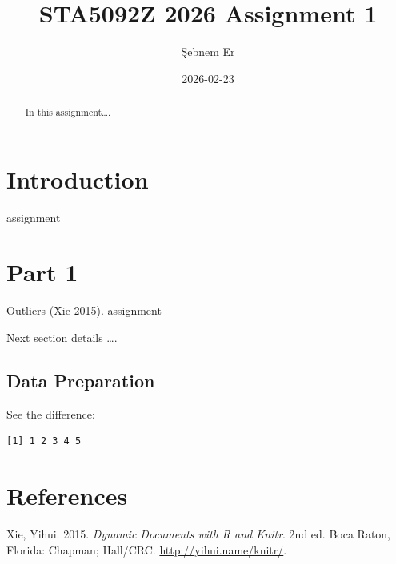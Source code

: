 \documentclass[
  letterpaper,
  DIV=11,
  numbers=noendperiod]{scrartcl}
\title{STA5092Z 2026 Assignment 1}
\author{Şebnem Er}
\date{2026-02-23}
\newlength{\cslhangindent}
\newenvironment{CSLReferences}[2] %
 {\begin{list}{}{%
  \setlength{\itemindent}{0pt}
  \setlength{\leftmargin}{0pt}
  \setlength{\parsep}{0pt}
  \ifodd #1
   \setlength{\leftmargin}{\cslhangindent}
   \setlength{\itemindent}{-1\cslhangindent}
  \fi
  \setlength{\itemsep}{#2\baselineskip}}}
 {\end{list}}
\renewcommand*\contentsname{Table of contents}
\newcommand\contentsname{Table of contents}
\begin{document}
\maketitle
\begin{abstract}
In this assignment\ldots.
\end{abstract}

\renewcommand*\contentsname{Table of contents}
{
\hypersetup{linkcolor=}
\setcounter{tocdepth}{3}
\tableofcontents
}

\section{Introduction}\label{introduction}

assignment

\section{Part 1}\label{part-1}

Outliers (Xie 2015). assignment

Next section details \ldots.

\subsection{Data Preparation}\label{data-preparation}

See the difference:

\begin{verbatim}
[1] 1 2 3 4 5
\end{verbatim}

\section*{References}\label{references}

\label{refs}
\begin{CSLReferences}{1}{0}
Xie, Yihui. 2015. \emph{Dynamic Documents with {R} and Knitr}. 2nd ed.
Boca Raton, Florida: Chapman; Hall/CRC. \url{http://yihui.name/knitr/}.

\end{CSLReferences}
\end{document}
